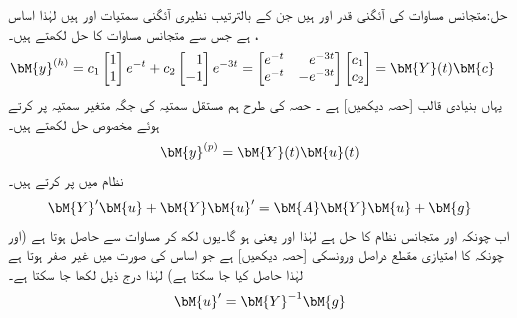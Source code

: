 حل:متجانس مساوات کی آئگنی قدر  اور  ہیں جن کے بالترتیب نظیری آئگنی سمتیات  اور  ہیں لہٰذا  اساس ،  ہے جس سے متجانس مساوات کا حل  لکھتے ہیں۔
\begin{gather}
\begin{aligned}\label{مساوات_نظام_مقدار_معلوم_وائے}
\bM{y}^{(h)}&=c_1\begin{bmatrix}1\\1 \end{bmatrix}e^{-t}+c_2\begin{bmatrix*}[r]  1\\-1\end{bmatrix*}e^{-3t}=\begin{bmatrix*}[r] e^{-t}&e^{-3t} \\ e^{-t} &-e^{-3t} \end{bmatrix*} \begin{bmatrix} c_1\\c_2 \end{bmatrix}=\bM{Y}(t)\bM{c}
\end{aligned}
\end{gather}
یہاں  بنیادی قالب [حصہ  دیکھیں] ہے ۔ حصہ  کی طرح ہم مستقل سمتیہ  کی جگہ متغیر سمتیہ  پر کرتے ہوئے مخصوص حل  لکھتے ہیں۔
\begin{align}
\bM{y}^{(p)}=\bM{Y}(t)\bM{u}(t)
\end{align}
نظام  میں  پر کرتے ہیں۔
\begin{align}\label{مساوات_نظام_بنیادی_نظام_الف}
\bM{Y}'\bM{u}+\bM{Y}\bM{u}'=\bM{A}\bM{Y}\bM{u}+\bM{g}
\end{align}
اب چونکہ  اور  متجانس نظام کا حل ہے لہٰذا  اور
  یعنی ہو گا۔یوں  لکھ کر مساوات  سے   حاصل ہوتا ہے (اور چونکہ  کا امتیازی مقطع دراصل ورونسکی [حصہ  دیکھیں]  ہے جو اساس کی صورت میں غیر صفر ہوتا ہے لہٰذا  حاصل کیا جا سکتا ہے) لہٰذا درج ذیل لکھا جا سکتا ہے۔
\begin{align}
\bM{u}'=\bM{Y}^{-1}\bM{g}
\end{align}
